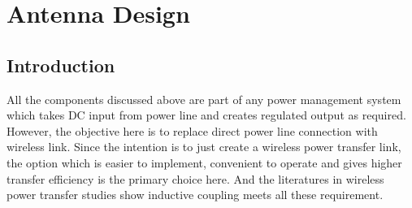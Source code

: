 \documentclass[UKenglish]{ifimaster}  %
\begin{document}


\clearpage
\newpage




\chapter{Antenna Design}  

\section{Introduction}		%

All the components discussed above are part of any power management system which takes DC input from power line 
and creates regulated output as required. However, the objective here is to replace direct power line connection with 
wireless link. Since the intention is to just create a wireless power transfer link, the option which is easier to implement, 
convenient to operate and gives higher transfer efficiency is the primary choice here. And the literatures in wireless power 
transfer studies show inductive coupling meets all these requirement. \\
\end{document}
